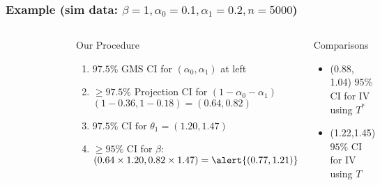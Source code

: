 \documentclass[handout]{beamer}
\begin{document}
\begin{frame}
  \frametitle{Example \hfill \small{(sim data: $\beta = 1, \alpha_0 = 0.1, \alpha_1 = 0.2, n = 5000$)}}

\begin{columns}
  \vspace{-3em}
\begin{figure}[h]
  \centering
\resizebox{\textwidth}{!}{%
  
}
\end{figure}
  \scriptsize

  \begin{alertblock}{\small Our Procedure} 
  \begin{enumerate}
    \item $97.5\%$ GMS CI for $(\alpha_0, \alpha_1)$ at left
      \pause
    \item $\geq 97.5\%$ Projection CI for $(1 - \alpha_0 - \alpha_1)$ \\ $(1 - 0.36, 1 - 0.18) = (0.64, 0.82)$ 
      \pause
    \item $97.5\% \mbox{ CI for } \theta_1 = (1.20, 1.47)$ 
      \pause
    \item $\geq 95\%$ CI for $\beta$: \\
      $(0.64 \times 1.20, 0.82 \times 1.47) = \alert{(0.77,1.21)} $
  \end{enumerate}
    \end{alertblock}
\pause
  \begin{block}{\small Comparisons}
    \begin{itemize}
      \item (0.88, 1.04) $95\%$ CI for IV using $T^*$ 
      \item (1.22,1.45) $95\%$ CI for IV using $T$
    \end{itemize}
\end{block}

\end{columns}


\end{frame}
\end{document}
